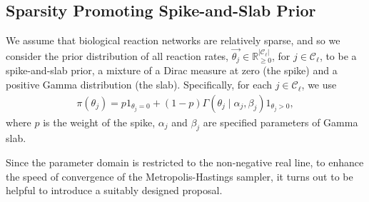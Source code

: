 \documentclass[pdflatex,sn-mathphys-num]{sn-jnl}%
\def\dd{\text{d}}
\theoremstyle{thmstyleone}%
\theoremstyle{thmstyletwo}%
\theoremstyle{thmstylethree}%
\begin{document}
\subsection{Sparsity Promoting Spike-and-Slab Prior}

We assume that biological reaction networks are relatively sparse, and so we consider the prior distribution of all reaction rates, $\overrightarrow{\theta_{j}}\in \mathbb{R}_{\geq 0}^{\left|\mathcal{C}_{\ell} \right|}$, for $j \in \mathcal{C}_{\ell}$, to be a spike-and-slab prior, a mixture of a Dirac measure at zero (the spike) and a positive Gamma distribution (the slab).  Specifically, for each $j \in \mathcal{C}_{\ell}$, we use 
\begin{align}
\pi\left(\theta_{j}\right)= p\mathrm{1}_{\theta_{j}=0} + (1-p) \Gamma(\theta_{j} \mid \alpha_{j}, \beta_{j})\mathrm{1}_{\theta_{j}> 0},\label{SpSl}
\end{align}
where $p$ is the weight of the spike, $ \alpha_{j}$ and $\beta_{j}$ are specified parameters of Gamma slab.


Since the parameter domain is restricted to the non-negative real line, to enhance the speed of convergence of the Metropolis-Hastings sampler, it turns out to be helpful to introduce a suitably designed proposal.
\end{document}
